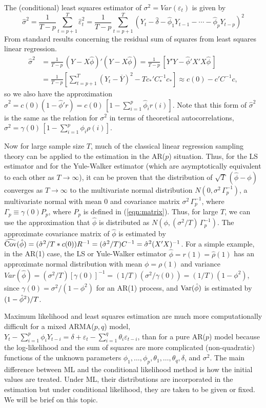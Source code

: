 The (conditional) least squares estimator of $\sigma^2 = Var(\varepsilon_t)$ is given by
	\[
	\hat{\sigma}^2 = \frac{1}{T - p}\sum_{t=p+1}^T \hat{\varepsilon}_t^2 = \frac{1}{T - p}\sum_{t=p+1}^T(Y_t - \hat{\delta} - \hat{\phi}_1Y_{t-1} - \cdots - \hat{\phi}_pY_{t-p})^2
	\]
From standard results concerning the residual sum of squares from least squares linear regression.
	\[
	\begin{split}
\hat{\sigma}^2 &= \frac{1}{T - p}\, (Y - X\hat{\phi})'(Y - X\hat{\phi}) = \frac{1}{T - p} \, [Y'Y - \hat{\phi}'X'X\hat{\phi} \,] \\
	&= \frac{1}{T - p} \left[\sum_{t=p+1}^T(Y_t - \overline{Y})^2 - Tc_*'C_*^{-1}c_* \right] \approx c(0) - c'C^{-1}c,
	\end{split}
	\]
so we also have the approximation $\hat{\sigma}^2 = c(0)(1 - \hat{\phi}'r) = c(0)\,[1 - \sum_{i=1}^p\hat{\phi}_ir(i)]$. Note that this form of $\hat{\sigma}^2$ is the same as the relation for $\sigma^2$ in terms of theoretical autocorrelations, $\sigma^2 = \gamma(0)\,[1 - \sum_{i=1}^p\phi_i\rho(i)]$.


Now for large sample size $T$, much of the classical linear regression sampling theory can be applied to the estimation in the AR($p$) situation. Thus, for the LS estimator and for the Yule-Walker estimator (which are asymptotically equivalent to each other as $T \to \infty$), it can be proven that the distribution of $\sqrt{T}\,(\hat{\phi} - \phi)$ converges as $T \to \infty$ to the multivariate normal distribution $N(0,\sigma^2\,\Gamma_p^{-1})$, a multivariate normal with mean 0 and covariance matrix $\sigma^2\,\Gamma_p^{-1}$, where $\Gamma_p \equiv \gamma(0)P_p$, where $P_p$ is defined in (\ref{eqn:matrix}). Thus, for large $T$, we can use the approximation that $\hat{\phi}$ is distributed as $N(\phi,(\sigma^2/T)\,\Gamma_p^{-1})$. The approximate covariance matrix of $\hat{\phi}$ is estimated by $\widehat{\operatorname{Cov}}(\hat{\phi}) = (\hat{\sigma}^2/T\ast c(0) )R^{-1} = (\hat{\sigma}^2/T)C^{-1} = \hat{\sigma}^2(X'X)^{-1}$. For a simple example, in the AR(1) case, the LS or Yule-Walker estimator $\hat{\phi} = r(1) = \hat{\rho}(1)$ has an approximate normal distribution with mean $\phi = \rho(1)$ and variance $Var(\hat{\phi}) = (\sigma^2/T)[\gamma(0)]^{-1} = (1/T)(\sigma^2/\gamma(0)) = (1/T)(1 - \phi^2)$, since $\gamma(0) = \sigma^2/(1 - \phi^2)$ for an AR(1) process, and $\operatorname{Var}(\hat{\phi})$ is estimated by $(1 - \hat{\phi}^2\hspace{0.01cm})/T$.


Maximum likelihood and least squares estimation are much more computationally difficult for a mixed ARMA($p,q$) model, $Y_t - \sum_{i=1}^p \phi_i Y_{t-i} = \delta + \varepsilon_t - \sum_{i=1}^q\theta_i\varepsilon_{t-i}$, than for a pure AR($p$) model because the log-likelihood and the sum of squares are more complicated (non-quadratic) functions of the unknown parameters $\phi_1,\ldots,\phi_p,\theta_1,\ldots,\theta_q, \delta$, and $\sigma^2$. The main difference between ML and the conditional likelihood method is how the initial values are treated. Under ML, their distributions are incorporated in the estimation but under conditional likelihood, they are taken to be given or fixed. We will be brief on this topic.


